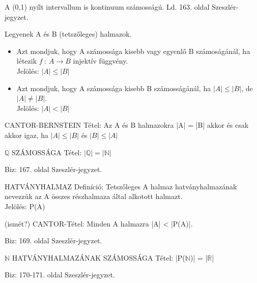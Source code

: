 A (0,1) nyílt intervallum is kontinuum számosságú. Ld. 163. oldal Szeszlér-jegyzet.
\begin{definicio}{
Legyenek A és B (tetszőleges) halmazok}.
\begin{itemize}
\item Azt mondjuk, hogy A számossága kisebb vagy egyenlő B számoságánál, ha létezik $f\::\:A \to B$ injektív függvény.\\
Jelölés: $|A| \leq |B|$
\item Azt mondjuk, hogy A számossága kisebb B számosságánál, ha $|A| \leq |B|$, de $|A| \neq |B|$.\\
Jelölés: $|A| < |B|$
\end{itemize}
\end{definicio}
\begin{tetel}{
CANTOR-BERNSTEIN Tétel}: Az A és B halmazokra |A| = |B| akkor és csak akkor igaz, ha $|A| \leq |B|$ és $|B| \leq |A|$
\end{tetel}
\begin{tetel}{
$\mathbb{Q}$ SZÁMOSSÁGA Tétel}: $|\mathbb{Q}| = |\mathbb{N}|$
\end{tetel}
\begin{leftbar}
Biz: 167. oldal Szeszlér-jegyzet.
\end{leftbar}
\begin{definicio}{
HATVÁNYHALMAZ Definíció}: Tetszőleges A halmaz hatványhalmazának nevezzük az A összes részhalmaza által alkotott halmazt.\\
Jelölés: P(A)
\end{definicio}
\begin{tetel}{
(ismét?) CANTOR-Tétel}: Minden A halmazra |A| < |P(A)|.
\end{tetel}
\begin{leftbar}
Biz: 169. oldal Szeszlér-jegyzet.
\end{leftbar}
\begin{tetel}{
$\mathbb{N}$ HATVÁNYHALMAZÁNAK SZÁMOSSÁGA Tétel}: |P($\mathbb{N}$)| = |$\mathbb{R}$|
\end{tetel}
\begin{leftbar}
Biz: 170-171. oldal Szeszlér-jegyzet.
\end{leftbar}
